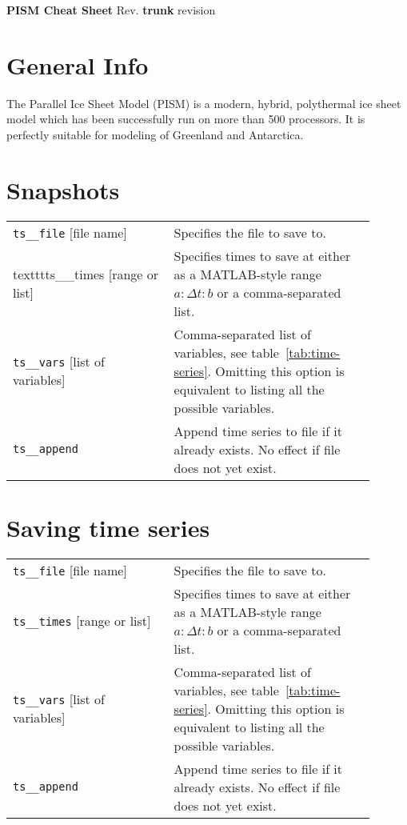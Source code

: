 \documentclass[10pt,landscape]{article}
\newcommand{\PISMREV}{\textbf{trunk} revision }
\newcommand{\und}{\_\!\_}
\begin{document}
\begin{center}
     \Large{\textbf{PISM Cheat Sheet} Rev. \PISMREV} \\
\end{center}


\begin{multicols*}{3}


\setlength{\columnseprule}{0.25pt}
\setlength{\premulticols}{1pt}
\setlength{\postmulticols}{1pt}
\setlength{\multicolsep}{1pt}
\setlength{\columnsep}{2pt}

\section{General Info}

The Parallel Ice Sheet Model (PISM) is a modern, hybrid, polythermal
ice sheet model which has been successfully run on more than 500
processors. It is perfectly suitable for modeling of Greenland and Antarctica.


\section{Snapshots}

\begin{tabular}{@{}p{0.4\linewidth}p{0.5\linewidth}@{}}
  \texttt{ts\und file} [file name] & Specifies the file to save to.\\
    texttt{ts\und times} [range or list] & Specifies times to save at either as a MATLAB-style range $a:\Delta t:b$ or a comma-separated list. \\
    \texttt{ts\und vars} [list of variables] & Comma-separated list of variables, see table~\ref{tab:time-series}. Omitting this option is equivalent to listing all the possible variables.\\
    \texttt{ts\und append} & Append time series to file if it already exists.  No effect if file does not yet exist.
\end{tabular}


\section{Saving time series}

\begin{tabular}{@{}p{0.4\linewidth}p{0.5\linewidth}@{}}
  \texttt{ts\und file} [file name] & Specifies the file to save to.\\
  \texttt{ts\und times} [range or list] & Specifies times to save at either as a MATLAB-style range $a:\Delta t:b$ or a comma-separated list. \\
  \texttt{ts\und vars} [list of variables] & Comma-separated list of variables, see table~\ref{tab:time-series}. Omitting this option is equivalent to listing all the possible variables.\\
  \texttt{ts\und append} & Append time series to file if it already exists.  No effect if file does not yet exist. \\
\end{tabular}




\end{multicols*}
\end{document}
